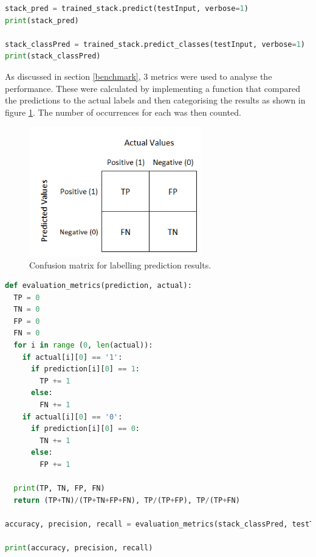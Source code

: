 \documentclass[10pt,onecolumn,letterpaper]{article}
\begin{document}
\begin{lstlisting}[language=Python, breaklines=true, caption= {Keras predict functions to generate predicted labels from test data.}]
stack_pred = trained_stack.predict(testInput, verbose=1)
print(stack_pred)

stack_classPred = trained_stack.predict_classes(testInput, verbose=1)
print(stack_classPred)
\end{lstlisting} 

As discussed in section \ref{benchmark}, 3 metrics were used to analyse the performance. These were calculated by implementing a function that compared the predictions to the actual labels and then categorising the results as shown in figure \ref{confusion_matrix}. The number of occurrences for each was then counted.

\begin{figure}[!hbt!]
\centering
\includegraphics[width=7.5cm]{confusion_matrix.png}
\caption{Confusion matrix for labelling prediction results.}
\label{confusion_matrix}
\end{figure}

\begin{lstlisting}[language=Python, breaklines=true, caption= Implemented function which evaluates the model prediction performance based on accuracy\, precision and recall.]
def evaluation_metrics(prediction, actual):
  TP = 0
  TN = 0
  FP = 0
  FN = 0
  for i in range (0, len(actual)):
    if actual[i][0] == '1':
      if prediction[i][0] == 1:
        TP += 1
      else:
        FN += 1
    if actual[i][0] == '0':
      if prediction[i][0] == 0:
        TN += 1
      else: 
        FP += 1
     
  print(TP, TN, FP, FN)
  return (TP+TN)/(TP+TN+FP+FN), TP/(TP+FP), TP/(TP+FN)

accuracy, precision, recall = evaluation_metrics(stack_classPred, testTarget)

print(accuracy, precision, recall)
\end{lstlisting} 
\end{document}
